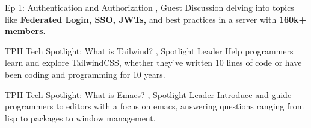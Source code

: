 

\begin{cventries}


\cventrynoposition
    {Ep 1: Authentication and Authorization} %
    {, Guest}
    {}
    {Discussion delving into topics like \textbf{Federated Login, SSO, JWTs,} and best practices in a server with \textbf{160k+ members}.}

\cventrynoposition
    {TPH Tech Spotlight: What is Tailwind?} %
    {, Spotlight Leader}
    {}
    {Help programmers learn and explore TailwindCSS, whether they've written 10 lines of code or have been coding and programming for 10 years.}

\cventrynoposition
    {TPH Tech Spotlight: What is Emacs?} %
    {, Spotlight Leader}
    {}
    {Introduce and guide programmers to editors with a focus on emacs, answering questions ranging from lisp to packages to window management.}


\end{cventries}
